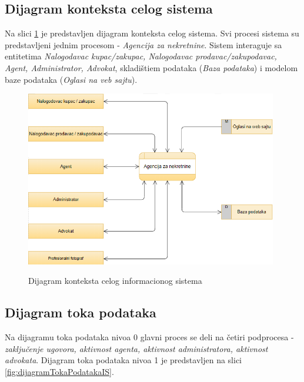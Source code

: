 \documentclass[20pt]{article}
\begin{document}
\newpage
\subsection{\bfseries \Large Dijagram konteksta celog sistema}
\setlength{\parindent}{1cm}
\fontsize{13}{18} \selectfont 

Na slici \ref{fig:dijagramKontekstaCelogIS} je predstavljen dijagram konteksta celog sistema. Svi procesi sistema su predstavljeni jednim procesom - {\it Agencija za nekretnine}. Sistem interaguje sa entitetima {\it Nalogodavac kupac/zakupac, Nalogodavac prodavac/zakupodavac, Agent, Administrator, Advokat}, skladi\v{s}tiem podataka ({\it Baza podataka}) i modelom baze podataka ({\it Oglasi na veb sajtu}).

\begin{figure}[h]
        \centering
        \includegraphics[width=0.98\textwidth,height=0.5\textheight]{Pictures/DijagramKontekstaCelogSistema}\\
        \caption{Dijagram konteksta celog informacionog sistema}
        \label{fig:dijagramKontekstaCelogIS}
    \end{figure}

\newpage
\subsection{\bfseries \Large Dijagram toka podataka}
\setlength{\parindent}{1cm}
\fontsize{13}{18} \selectfont 

Na dijagramu toka podataka nivoa 0 glavni proces se deli na \v{c}etiri podprocesa - {\it zaključenje ugovora, aktivnost agenta, aktivnost administratora, aktivnost advokata}.
Dijagram toka podataka nivoa 1 je predstavljen na slici \ref{fig:dijagramTokaPodatakaIS}. 
\end{document}
